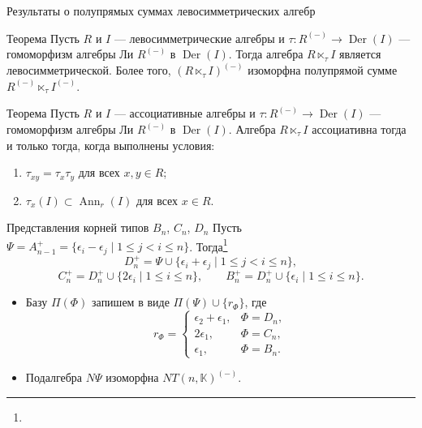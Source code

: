 \documentclass[12pt,aspectratio=169]{beamer}
\DeclareMathOperator{\Ann}{Ann}
\DeclareMathOperator{\Der}{Der}
\newcommand{\K}{\mathbb{K}}
\newcommand{\sourcefootnote}[1]{\footnote{\slidecite{#1}}}
\begin{document}
\begin{frame}[t]{Результаты о полупрямых суммах левосимметрических алгебр}
    \small
    \begin{block}{Теорема}
        Пусть $R$ и $I$ --- левосимметрические алгебры и $\tau\colon R^{(-)}\to\Der(I)$
        --- гомоморфизм алгебры Ли $R^{(-)}$ в $\Der(I)$. Тогда алгебра
        $R\ltimes_{\tau} I$ является левосимметрической. Более того, $(R\ltimes_{\tau}
        I)^{(-)}$ изоморфна полупрямой сумме $R^{(-)}\ltimes_\tau I^{(-)}$.
    \end{block}
    \begin{block}{Теорема}
        Пусть $R$ и $I$ --- ассоциативные алгебры и $\tau\colon R^{(-)}\to\Der(I)$
        --- гомоморфизм алгебры Ли $R^{(-)}$ в $\Der(I)$. Алгебра
        $R\ltimes_{\tau} I$ ассоциативна тогда и только тогда, когда выполнены условия:
        \begin{enumerate}
            \item[\textup{(A)}] $\tau_{xy}=\tau_x\tau_y$ для всех $x,y\in R$;
            \item[\textup{(B)}] $\tau_x(I)\subset \Ann_r(I)$ для всех $x\in R$.
        \end{enumerate}
    \end{block}
\end{frame}

\begin{frame}[t]{Представления корней типов $B_n$, $C_n$, $D_n$}
    \small
    Пусть $\Psi=A_{n-1}^+=\{\epsilon_i-\epsilon_j \mid 1\leq j<i\leq n\}$.
    Тогда\sourcefootnote{bourbaki72}
    \[
        D_n^+=\Psi\cup\{\epsilon_i+\epsilon_j \mid 1\le j<i\le n\},
    \]
    \[
        C_n^+=D_n^+\cup\{2\epsilon_i \mid 1\le i\le n\},
        \qquad
        B_n^+=D_n^+\cup\{\epsilon_i \mid 1\le i\le n\}.
    \]

    \begin{itemize}
        \item Базу $\Pi(\Phi)$ запишем в виде $\Pi(\Psi)\cup\{r_\Phi\}$, где
              \[
                  r_\Phi=
                  \begin{cases}
                      \epsilon_2 + \epsilon_1, & \Phi=D_n, \\
                      2\epsilon_1,             & \Phi=C_n, \\
                      \epsilon_1,              & \Phi=B_n.
                  \end{cases}
              \]
        \item Подалгебра $N\Psi$ изоморфна $NT(n,\K)^{(-)}$.
    \end{itemize}
\end{frame}
\end{document}
